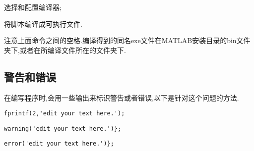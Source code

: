  \begindot
  \item {} 选择和配置编译器;
  \item {} 将脚本编译成可执行文件.
 \myenddot

注意上面命令之间的空格.编译得到的同名exe文件在MATLAB安装目录的bin文件夹下,或者在所编译文件所在的文件夹下.

\subsection{警告和错误}
在编写程序时,会用一些输出来标识警告或者错误,以下是针对这个问题的方法.

\vspace{-0.8cm}
\begin{lstlisting}[caption = 红色字符串输出]
  fprintf(2,'edit your text here.');
\end{lstlisting}


\vspace{-0.8cm}
\begin{lstlisting}[caption = 警告输出]
  warning('edit your text here.')};
\end{lstlisting}

\vspace{-0.8cm}
\begin{lstlisting}[caption = 错误输出]
  error('edit your text here.')};
\end{lstlisting}


